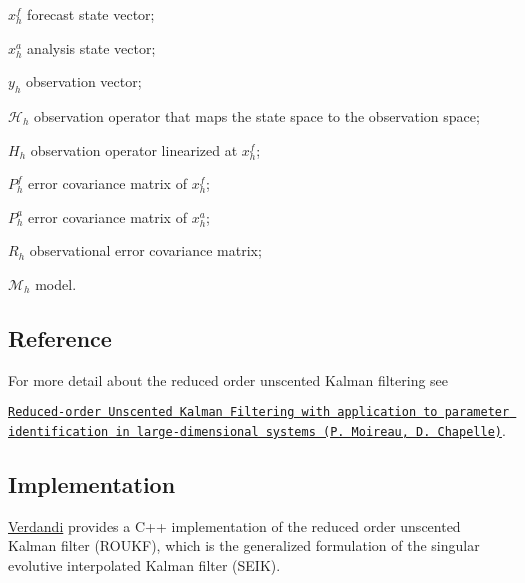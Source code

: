 \documentclass{tufte-book}
\begin{document}
 $x_h^f$ forecast state vector; \par
 $x_h^a$ analysis state vector; \par
 $y_h$ observation vector; \par
 $\mathcal{H}_h$ observation operator that maps the state space to the observation space; \par
 $H_h$ observation operator linearized at $x^f_h$; \par
 $P^f_h$ error covariance matrix of $x_h^f$; \par
 $P^a_h$ error covariance matrix of $x_h^a$; \par
 $R_h$ observational error covariance matrix; \par
 $\mathcal{M}_h$ model.

 \hypertarget{unscented_kalman_filter_ukf_ref}{}\subsection{\-Reference}\label{unscented_kalman_filter_ukf_ref}
\-For more detail about the reduced order unscented \-Kalman filtering see\par
 \href{http://dx.doi.org/10.1051/cocv/2010006}{\tt \-Reduced-\/order \-Unscented \-Kalman \-Filtering with application to parameter identification in large-\/dimensional systems (\-P. \-Moireau, \-D. \-Chapelle)}.


 \hypertarget{unscented_kalman_filter_ukf_implementation}{}\subsection{\-Implementation}\label{unscented_kalman_filter_ukf_implementation}

 \hyperlink{namespace_verdandi}{\-Verdandi} provides a \-C++ implementation of the reduced order unscented \-Kalman filter (\-R\-O\-U\-K\-F), which is the generalized formulation of the singular evolutive interpolated \-Kalman filter (\-S\-E\-I\-K).
\end{document}
